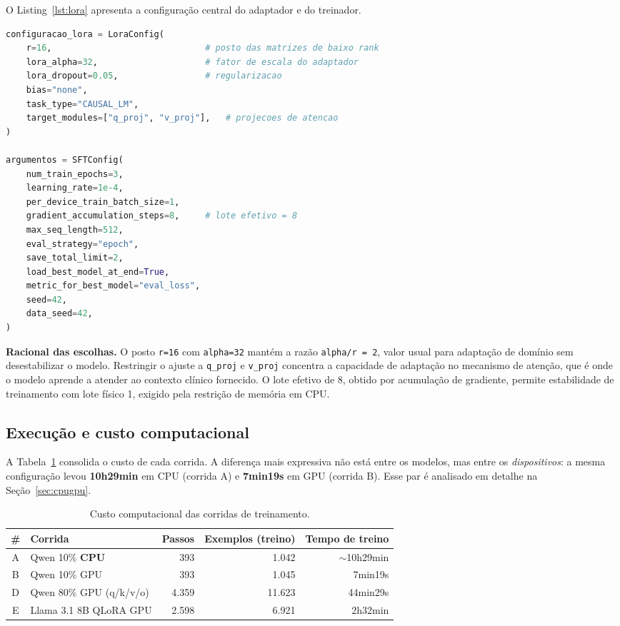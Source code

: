 \documentclass[12pt,a4paper]{article}
\begin{document}
O Listing~\ref{lst:lora} apresenta a configuração central do adaptador e do
treinador.

\begin{lstlisting}[language=Python,caption={Configuracao LoRA e do SFTTrainer.},label={lst:lora}]
configuracao_lora = LoraConfig(
    r=16,                              # posto das matrizes de baixo rank
    lora_alpha=32,                     # fator de escala do adaptador
    lora_dropout=0.05,                 # regularizacao
    bias="none",
    task_type="CAUSAL_LM",
    target_modules=["q_proj", "v_proj"],   # projecoes de atencao
)

argumentos = SFTConfig(
    num_train_epochs=3,
    learning_rate=1e-4,
    per_device_train_batch_size=1,
    gradient_accumulation_steps=8,     # lote efetivo = 8
    max_seq_length=512,
    eval_strategy="epoch",
    save_total_limit=2,
    load_best_model_at_end=True,
    metric_for_best_model="eval_loss",
    seed=42,
    data_seed=42,
)
\end{lstlisting}

\noindent\textbf{Racional das escolhas.} O posto \texttt{r=16} com
\texttt{alpha=32} mantém a razão \texttt{alpha/r = 2}, valor usual para adaptação
de domínio sem desestabilizar o modelo. Restringir o ajuste a \texttt{q\_proj} e
\texttt{v\_proj} concentra a capacidade de adaptação no mecanismo de atenção, que
é onde o modelo aprende a atender ao contexto clínico fornecido. O lote efetivo
de 8, obtido por acumulação de gradiente, permite estabilidade de treinamento com
lote físico 1, exigido pela restrição de memória em CPU.

\subsection{Execução e custo computacional}

A Tabela~\ref{tab:custo} consolida o custo de cada corrida. A diferença mais
expressiva não está entre os modelos, mas entre os \emph{dispositivos}: a mesma
configuração levou \textbf{10h29min} em CPU (corrida A) e \textbf{7min19s} em GPU
(corrida B). Esse par é analisado em detalhe na Seção~\ref{sec:cpugpu}.

\begin{table}[htbp]
\centering
\caption{Custo computacional das corridas de treinamento.}
\label{tab:custo}
\footnotesize
\begin{tabular}{clrrr}
\toprule
\textbf{\#} & \textbf{Corrida} & \textbf{Passos} & \textbf{Exemplos (treino)} & \textbf{Tempo de treino} \\
\midrule
A & Qwen 10\% \textbf{CPU}       &   393 &  1.042 & $\sim$10h29min \\
B & Qwen 10\% GPU                &   393 &  1.045 & 7min19s        \\
D & Qwen 80\% GPU (q/k/v/o)      & 4.359 & 11.623 & 44min29s       \\
E & Llama 3.1 8B QLoRA GPU       & 2.598 &  6.921 & 2h32min        \\
\bottomrule
\end{tabular}
\end{table}
\end{document}
